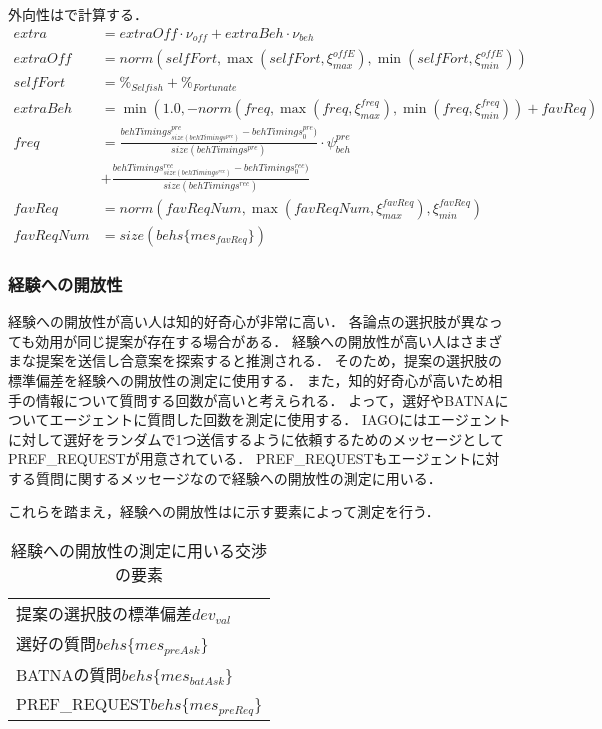外向性はで計算する．
\begin{align}
    extra &= \mathit{extraOff} \cdot \nu_{\mathit{off}} + extraBeh \cdot \nu_{beh} \label{eq:extraversion} \\
    \mathit{extraOff} &= norm\left( \mathit{selfFort}, \max \left( \mathit{selfFort}, \xi_{max}^{\mathit{offE}}\right) , \min \left( \mathit{selfFort}, \xi_{min}^{\mathit{offE}}\right) \right) \nonumber \\
    \mathit{selfFort} &= \%_{\mathit{Selfish}} + \%_{Fortunate} \nonumber \\
    extraBeh &= \min \left( 1.0, -norm\left( \mathit{freq}, \max \left( \mathit{freq}, \xi_{max}^{\mathit{freq}}\right), \min\left( \mathit{freq}, \xi_{min}^{\mathit{freq}}\right) \right) + \mathit{favReq}\right) \nonumber \\
    \mathit{freq} &= \frac{behTimings^{pre}_{size(behTimings^{pre})} - behTimings^{pre}_0)}{size(behTimings^{pre})} \cdot \psi_{\mathit{beh}}^{pre} \nonumber \\
    &+ \frac{behTimings^{rec}_{size(behTimings^{rec})} - behTimings^{rec}_0)}{size(behTimings^{rec})} \nonumber \\
    \mathit{favReq} &= norm\left( \mathit{favReqNum}, \max \left( \mathit{favReqNum}, \xi_{max}^{\mathit{favReq}}\right), \xi_{min}^{\mathit{favReq}} \right) \nonumber \\
    \mathit{favReqNum} &= size(behs\{mes_{\mathit{favReq}}\}) \nonumber
\end{align}

\subsubsection{経験への開放性}
経験への開放性が高い人は知的好奇心が非常に高い．
各論点の選択肢が異なっても効用が同じ提案が存在する場合がある．
経験への開放性が高い人はさまざまな提案を送信し合意案を探索すると推測される．
そのため，提案の選択肢の標準偏差を経験への開放性の測定に使用する．
また，知的好奇心が高いため相手の情報について質問する回数が高いと考えられる．
よって，選好やBATNAについてエージェントに質問した回数を測定に使用する．
IAGOにはエージェントに対して選好をランダムで1つ送信するように依頼するためのメッセージとしてPREF\_REQUESTが用意されている．
PREF\_REQUESTもエージェントに対する質問に関するメッセージなので経験への開放性の測定に用いる．

これらを踏まえ，経験への開放性はに示す要素によって測定を行う．

\begin{table}[tb]
    \centering
    \caption{経験への開放性の測定に用いる交渉の要素}
    \begin{tabular}{l} \toprule
        提案の選択肢の標準偏差$dev_{val}$ \\
        選好の質問$behs\{mes_{\mathit{preAsk}}\}$  \\
        BATNAの質問$behs\{mes_{\mathit{batAsk}}\}$ \\
        PREF\_REQUEST$behs\{mes_{\mathit{preReq}}\}$ \\ \bottomrule
    \end{tabular}
    \label{tab:openness}
\end{table}

